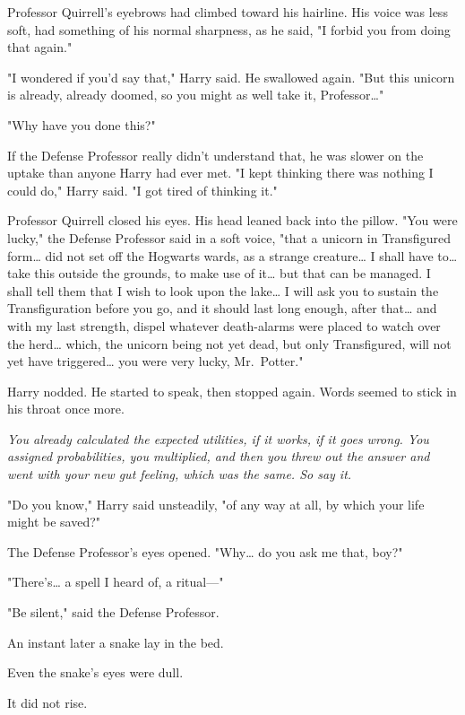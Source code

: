 Professor Quirrell's eyebrows had climbed toward his hairline. His voice was 
less soft, had something of his normal sharpness, as he said, "I forbid you 
from doing that again."

"I wondered if you'd say that," Harry said. He swallowed again. "But this 
unicorn is already, already doomed, so you might as well take it, 
Professor{\ldots}"

"Why have you done this?"

If the Defense Professor really didn't understand that, he was slower on the 
uptake than anyone Harry had ever met. "I kept thinking there was nothing I 
could do," Harry said. "I got tired of thinking it."

Professor Quirrell closed his eyes. His head leaned back into the pillow. "You 
were lucky," the Defense Professor said in a soft voice, "that a unicorn in 
Transfigured form{\ldots} did not set off the Hogwarts wards, as a strange 
creature{\ldots} I shall have to{\ldots} take this outside the grounds, to make 
use of it{\ldots} but that can be managed. I shall tell them that I wish to 
look upon the lake{\ldots} I will ask you to sustain the Transfiguration before 
you go, and it should last long enough, after that{\ldots} and with my last 
strength, dispel whatever death-alarms were placed to watch over the 
herd{\ldots} which, the unicorn being not yet dead, but only Transfigured, will 
not yet have triggered{\ldots} you were very lucky, Mr.~Potter."

Harry nodded. He started to speak, then stopped again. Words seemed to stick in 
his throat once more.

\emph{You already calculated the expected utilities, if it works, if it goes 
wrong. You assigned probabilities, you multiplied, and then you threw out the 
answer and went with your new gut feeling, which was the same. So say it.}

"Do you know," Harry said unsteadily, "of any way at all, by which your life 
might be saved?"

The Defense Professor's eyes opened. "Why{\ldots} do you ask me that, boy?"

"There's{\ldots} a spell I heard of, a ritual---"

"Be silent," said the Defense Professor.

An instant later a snake lay in the bed.

Even the snake's eyes were dull.

It did not rise.

